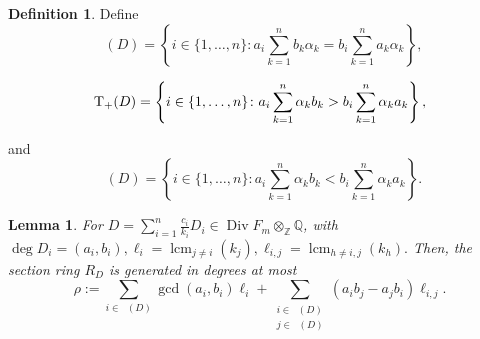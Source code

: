 \documentclass{amsart}
\theoremstyle{plain}
\newtheorem{lem}[thm]{Lemma}
\theoremstyle{definition}
\newtheorem{defn}[thm]{Definition}
\theoremstyle{remark}
\numberwithin{equation}{section}
\newcommand\bq{{\mathbb Q}}
\newcommand\bz{{\mathbb Z}}
\DeclareMathOperator\di{Div}
\newcommand\bida{a}
\newcommand\bidb{b}
\newcommand\hirz{F}
\DeclareMathOperator{\Te}{T_=}
\DeclareMathOperator{\Tp}{T_+}
\DeclareMathOperator{\Tm}{T_-}
\DeclareMathOperator{\lcm}{lcm}
\begin{document}
\begin{defn}
\label{defn:t-defn}
Define 
\begin{equation*}
	\Te(D) = \left\{i \in \{1, \ldots, n\}: \bida_i \sum_{k=1}^n \bidb_k 
\alpha_k = \bidb_i \sum_{k=1}^n \bida_k \alpha_k \right\},
\end{equation*}

\begin{equation*}
	\Tp(D) = \left\{ i \in \{1, \ldots, n\}\colon  \vphantom{\sum_{k = 1}^n} 
	\bida_i \sum_{k = 1}^n \alpha_k \bidb_k > \bidb_i \sum_{k = 1}^n \alpha_k \bida_k 
\right\},
\end{equation*}

\noindent
and
\begin{equation*}
	\Tm(D) = \left\{ i \in \{1, \ldots, n\}\colon \bida_i \sum_{k = 1}^n \alpha_k
	\bidb_k < \bidb_i \sum_{k=1}^n \alpha_k \bida_k \right\}.
\end{equation*}
\end{defn}

\begin{lem}
\label{lem:hirz-generators}
For $D = \sum_{i=1}^{n} \frac{c_i}{k_i}D_i \in \di \hirz_m \otimes_\bz \bq$, with $\deg D_i = (\bida_i, \bidb_i), \ell_i = \lcm_{j\neq i} (k_j), \ell_{i,j} = \lcm_{h \neq i,j} (k_h).$ Then, the section ring $R_D$ is generated in degrees at most
\begin{equation}\label{eqn:def-sigma}
	\rho := \sum_{i \in \Te(D)} \gcd(\bida_i, \bidb_i) \ell_i + \sum_{\substack
	{i \in \Tp(D) \\ j\in \Tm(D)}} (\bida_i \bidb_j - \bida_j \bidb_i)
	\ell	_{i,j}.
\end{equation}
\end{lem}
\end{document}
